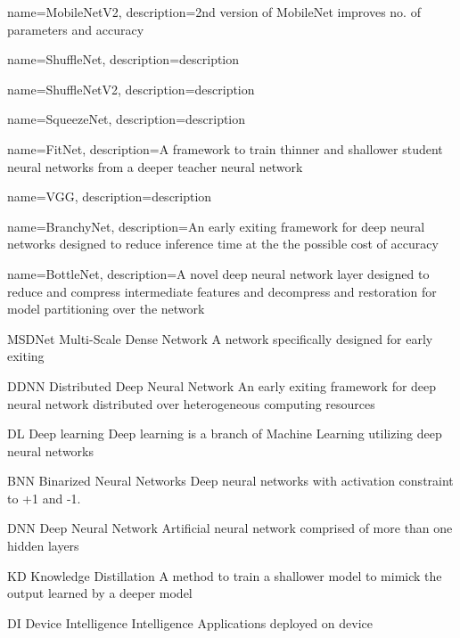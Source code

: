 {
	name={MobileNetV2},
	description={2nd version of MobileNet improves no. of parameters and accuracy}
}

{
	name={ShuffleNet},
	description={description}
}

{
	name={ShuffleNetV2},
	description={description}
}

{
	name={SqueezeNet},
	description={description}
}

{
	name={FitNet},
	description={A framework to train thinner and shallower student neural networks from a deeper teacher neural network}
}

{
	name={VGG},
	description={description}
}


{
	name={BranchyNet},
	description={An early exiting framework for deep neural networks designed to reduce inference time at the the possible cost of accuracy}
}

{
	name={BottleNet},
	description={A novel deep neural network layer designed to reduce and compress intermediate features and decompress and restoration for model partitioning over the network}
}

	{MSDNet}
	{Multi-Scale Dense Network}
	{A network specifically designed for early exiting}
	
	
	{DDNN}
	{Distributed Deep Neural Network}
	{An early exiting framework for deep neural network distributed over heterogeneous computing resources}
	
	{DL}
	{Deep learning}
	{Deep learning is a branch of Machine Learning utilizing deep neural networks}
	
	{BNN}
	{Binarized Neural Networks}
	{Deep neural networks with activation constraint to +1 and -1.}
	
	{DNN}
	{Deep Neural Network}
	{Artificial neural network comprised of more than one hidden layers}
	
	{KD}
	{Knowledge Distillation}
	{A method to train a shallower model to mimick the output learned by a deeper model}
	

{DI}
{Device Intelligence}
{Intelligence Applications deployed on device}


